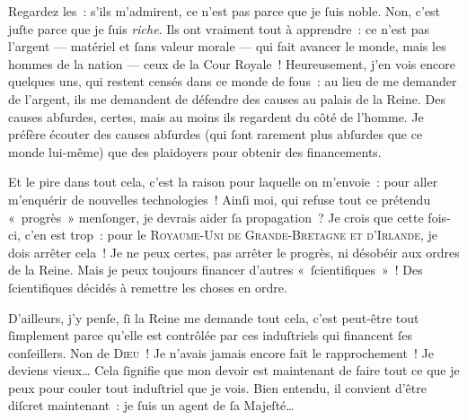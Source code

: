 {Regardez les~:  s’ils m’admirent, ce n’est pas parce que je ſuis noble.
Non, c’est juſte parce que je ſuis \emph{riche}.
Ils ont vraiment tout à apprendre~:  ce n’est pas l’argent — matériel et ſans valeur morale — qui fait avancer le monde, mais les hommes de la nation — ceux de la Cour Royale~!
Heureusement, j’en vois encore quelques uns, qui restent censés dans ce monde de fous~:  au lieu de me demander de l’argent, ils me demandent de défendre des causes au palais de la Reine.
Des causes abſurdes, certes, mais au moins ils regardent du côté de l’homme.
Je préfère écouter des causes abſurdes (qui ſont rarement plus abſurdes que ce monde lui-même) que des plaidoyers pour obtenir des financements.

Et le pire dans tout cela, c’est la raison pour laquelle on m’envoie~:  pour aller m’enquérir de nouvelles technologies~!
Ainſi moi, qui refuse tout ce prétendu «~progrès~» menſonger, je devrais aider ſa propagation~?
Je crois que cette fois-ci, c’en est trop~:  pour le \textsc{Royaume-Uni de Grande-Bretagne et d’Irlande}, je dois arrêter cela~!
Je ne peux certes, pas arrêter le progrès, ni désobéir aux ordres de la Reine.
Mais je peux toujours financer d’autres «~ſcientifiques~»~!  Des ſcientifiques décidés à remettre les choses en ordre.

D’ailleurs, j’y penſe, ſi la Reine me demande tout cela, c’est peut-être tout ſimplement parce qu’elle est contrôlée par ces induſtriels qui financent ſes conſeillers.
Non de \textsc{Dieu}~!  Je n’avais jamais encore fait le rapprochement~!  Je deviens vieux…
Cela ſignifie que mon devoir est maintenant de faire tout ce que je peux pour couler tout induſtriel que je vois.
Bien entendu, il convient d’être diſcret maintenant~:  je ſuis un agent de ſa Majeſté…
}

